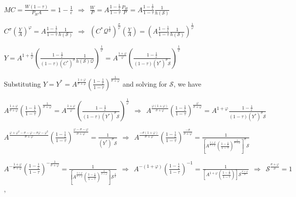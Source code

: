 \documentclass[
]{article}
\begin{document}
\(\displaystyle MC = \frac{W(1-\tau)}{P_{H} A} = 1-\frac{1}{\varepsilon} \ \ \Rightarrow \ \ \frac{W}{P}=A \frac{1-\frac{1}{\varepsilon}}{1-\tau} \frac{P_H}{P}=A \frac{1-\frac{1}{\varepsilon}}{1-\tau} \frac{1}{h (\mathcal{S})}\)

\(\displaystyle C^\sigma \left( \frac{Y}{A} \right)^\varphi = A \frac{1-\frac{1}{\varepsilon}}{1-\tau} \frac{1}{h (\mathcal{S})} \ \ \Rightarrow \ \ \left( C^*\mathcal{Q}^\frac{1}{\sigma} \right)^\frac{\sigma}{\varphi} \left( \frac{Y}{A} \right) = \left(A \frac{1-\frac{1}{\varepsilon}}{1-\tau} \frac{1}{h (\mathcal{S})} \right)^\frac{1}{\varphi}\)

\(\displaystyle Y=A^{1+\frac{1}{\varphi}} \left( \frac{1-\frac{1}{\varepsilon}}{(1-\tau)(C^*)^\sigma} \frac{1}{ h (\mathcal{S})\mathcal{Q}} \right)^\frac{1}{\varphi} = A^{\frac{1+\varphi}{\varphi}} \left( \frac{1-\frac{1}{\varepsilon}}{(1-\tau)(Y^*)^\sigma \mathcal{S}} \right)^\frac{1}{\varphi}\)

Substituting
\(\displaystyle Y=Y^*=A^{\frac{1+\varphi}{\sigma+\varphi}} \left( \frac{1-\frac{1}{\varepsilon}}{1-\tau} \right)^{\frac{1}{\sigma+\varphi}}\)
and solving for \(\mathcal{S}\), we have

\(\displaystyle A^{\frac{1+\varphi}{\sigma+\varphi}} \left( \frac{1-\frac{1}{\varepsilon}}{1-\tau} \right)^{\frac{1}{\sigma+\varphi}}=A^{\frac{1+\varphi}{\varphi}} \left( \frac{1-\frac{1}{\varepsilon}}{(1-\tau)(Y^*)^\sigma \mathcal{S}} \right)^\frac{1}{\varphi} \ \ \Rightarrow \ \ A^{\frac{\varphi({1+\varphi})}{\sigma+\varphi}} \left( \frac{1-\frac{1}{\varepsilon}}{1-\tau} \right)^{\frac{\varphi}{\sigma+\varphi}}=A^{1+\varphi} \frac{1-\frac{1}{\varepsilon}}{(1-\tau)(Y^*)^\sigma \mathcal{S}}\)

\(\displaystyle A^{\frac{\varphi+\varphi^2-\sigma-\varphi -\sigma\varphi-\varphi^2}{\sigma+\varphi}} \left( \frac{1-\frac{1}{\varepsilon}}{1-\tau} \right)^{\frac{\varphi-\sigma-\varphi}{\sigma+\varphi}} = \frac{1}{(Y^*)^\sigma \mathcal{S}} \ \ \Rightarrow \ \  A^{\frac{-\sigma(1+\varphi)}{\sigma+\varphi}} \left( \frac{1-\frac{1}{\varepsilon}}{1-\tau} \right)^{\frac{-\sigma}{\sigma+\varphi}} = \frac{1}{\left[A^{\frac{1+\varphi}{\sigma+\varphi}} \left( \frac{1-\frac{1}{\varepsilon}}{1-\tau} \right)^{\frac{1}{\sigma+\varphi}} \right]^\sigma \mathcal{S}}\)

\(\displaystyle A^{-\frac{1+\varphi}{\sigma+\varphi}} \left( \frac{1-\frac{1}{\varepsilon}}{1-\tau} \right)^{-\frac{1}{\sigma+\varphi}} = \frac{1}{\left[A^{\frac{1+\varphi}{\sigma+\varphi}} \left( \frac{1-\frac{1}{\varepsilon}}{1-\tau} \right)^{\frac{1}{\sigma+\varphi}} \right] \mathcal{S}^{\frac{1}{\sigma}}} \ \ \Rightarrow \ \ A^{-(1+\varphi)} \left( \frac{1-\frac{1}{\varepsilon}}{1-\tau} \right)^{-1} = \frac{1}{\left[A^{1+\varphi}\left( \frac{1-\frac{1}{\varepsilon}}{1-\tau} \right) \right] \mathcal{S}^{\frac{\sigma+\varphi}{\sigma}}} \ \ \Rightarrow \ \ \mathcal{S}^{\frac{\sigma+\varphi}{\sigma}}=1\),
\end{document}
